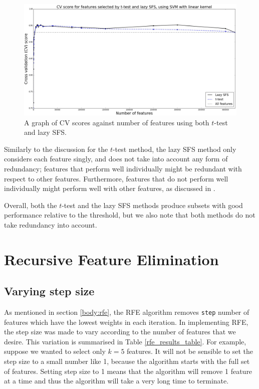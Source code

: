 \documentclass[12pt, twoside, a4paper]{report}
\begin{document}
\begin{figure}
\centering
\includegraphics[width=\textwidth]{images/t_test_and_lazy_sfs.jpeg}
\caption{A graph of CV scores against number of features using both $t$-test and lazy SFS.}
\label{body:t_test_and_lazy_sfs:graph}
\end{figure}

Similarly to the discussion for the $t$-test method, the lazy SFS method only considers each feature singly, and does not take into account any form of redundancy; features that perform well individually might be redundant with respect to other features. Furthermore, features that do not perform well individually might perform well with other features, as discussed in \cite{RefWorks:140}.


Overall, both the $t$-test and the lazy SFS methods produce subsets with good performance relative to the threshold, but we also note that both methods do not take redundancy into account.


\section{Recursive Feature Elimination} \label{eval:rfe}

\subsection{Varying step size}
As mentioned in section \ref{body:rfe}, the RFE algorithm removes \texttt{step} number of features which have the lowest weights in each iteration. In implementing RFE, the step size was made to vary according to the number of features that we desire. This variation is summarised in Table \ref{rfe_results_table}. For example, suppose we wanted to select only $k=5$ features. It will not be sensible to set the step size to a small number like 1, because the algorithm starts with the full set of features. Setting step size to 1 means that the algorithm will remove 1 feature at a time and thus the algorithm will take a very long time to terminate.
\end{document}
